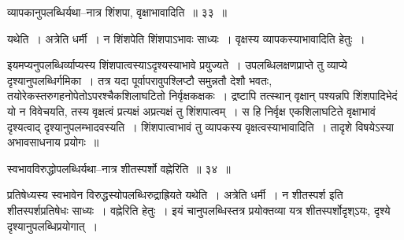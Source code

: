 \documentclass[article,12pt,a4paper]{memoir}
\begin{document}
	  \bigskip
	  \begingroup
	

	  \pstart व्यापकानुपलब्धिर्यथा--नात्र शिंशपा, वृक्षाभावादिति ॥ ३३ ॥
	\pend
      
	  \endgroup
	 

	  \pstart यथेति । अत्रेति धर्मी । न शिंशपेति शिंशपाऽभावः साध्यः । वृक्षस्य व्यापकस्याभावादिति हेतुः ।
	\pend
        

	  \pstart इयमप्यनुपलब्धिर्व्याप्यस्य शिंशपात्वस्याऽदृश्यस्याभावे प्रयुज्यते । उपलब्धिलक्षणप्राप्ते तु व्याप्ये दृश्यानुपलब्धिर्गमिका । तत्र यदा पूर्वापरावुपश्लिप्टौ समुन्नतौ देशौ भवतः, तयोरेकस्तरुगहनोपेतोऽपरश्चैकशिलाघटितो निर्वृक्षकक्षकः । द्रष्टापि तत्स्थान् वृक्षान् पश्यन्नपि शिंशपादिभेदं यो न विवेचयति, तस्य वृक्षत्वं प्रत्यक्षं अप्रत्यक्षं तु शिंशपात्वम् । स हि निर्वृक्ष एकशिलाघटिते वृक्षाभावं दृश्यत्वाद् दृश्यानुपलम्भादवस्यति । शिंशपात्वाभावं तु व्यापकस्य वृक्षत्वस्याभावादिति । तादृशे विषयेऽस्या अभावसाधनाय प्रयोगः ॥
	\pend
        
	  \bigskip
	  \begingroup
	

	  \pstart स्वभावविरुद्धोपलब्धिर्यथा--नात्र शीतस्पर्शो वह्नेरिति ॥ ३४ ॥
	\pend
      
	  \endgroup
	 

	  \pstart प्रतिषेध्यस्य स्वभावेन विरुद्धस्योपलब्धिरुद्राह्रियते यथेति । अत्रेति धर्मी । न शीतस्पर्श इति शीतस्पर्शप्रतिषेधः साध्यः । वह्नेरिति हेतुः । इयं चानुपलब्धिस्तत्र प्रयोक्तव्या यत्र शीतस्पर्शोदृश्ऽयः, दृश्ये दृश्यानुपलब्धिप्रयोगात् ।
	\pend
      
\end{document}
